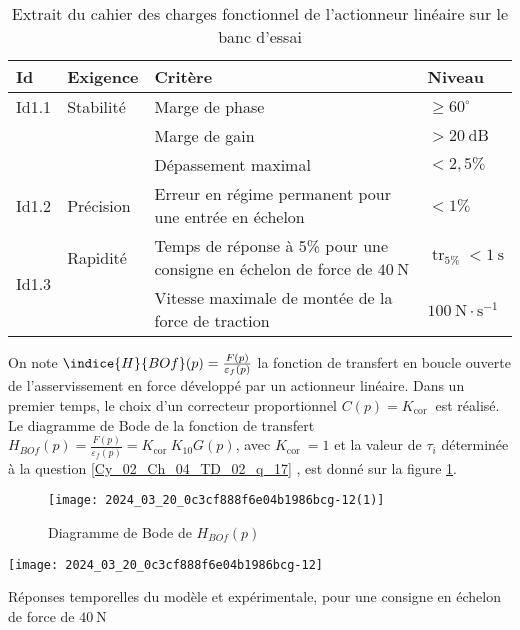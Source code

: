 \begin{table}[!h]
\begin{tabular}{llp{7cm}l}
\hline
\textbf{Id} & \textbf{Exigence} & \textbf{Critère} & \textbf{Niveau} \\
\hline
Id1.1 & Stabilité & Marge de phase & $\geqslant 60^{\circ}$ \\
 &  & Marge de gain & $>20 \mathrm{~dB}$ \\
 &  & Dépassement maximal & $<2,5 \%$ \\
Id1.2 & Précision & Erreur en régime permanent pour une entrée en échelon & $<1 \%$ \\
\multirow{2}{*}{Id1.3} & Rapidité & Temps de réponse à 5\% pour une consigne en échelon de force de $40 \mathrm{~N}$ & $\operatorname{tr}_{5 \%}<1 \mathrm{~s}$ \\
 &  & Vitesse maximale de montée de la force de traction & $100 \mathrm{~N} \cdot \mathrm{s}^{-1}$ \\
\hline
\end{tabular}
\caption{Extrait du cahier des charges fonctionnel de l'actionneur linéaire sur le banc d'essai \label{Cy_02_Ch_04_TD_02_tab_05}}
\end{table}

On note $\indice{H}{BO f}(p)=\frac{F(p)}{\varepsilon_{f}(p)}$ la fonction de transfert en boucle ouverte de l'asservissement en force développé par un actionneur linéaire. Dans un premier temps, le choix d'un correcteur proportionnel $C(p)=K_{\text {cor }}$ est réalisé. Le diagramme de Bode de la fonction de transfert $H_{B O f}(p)=\frac{F(p)}{\varepsilon_{f}(p)}=K_{\text {cor }} K_{10} G(p)$, avec $K_{\text {cor }}=1$ et la valeur de $\tau_{i}$ déterminée à la question \ref{Cy_02_Ch_04_TD_02_q_17} , est donné sur la figure \ref{Cy_02_Ch_04_TD_02_fig_16}.\\


\begin{figure}[!h]
\texttt{[image: 2024\_03\_20\_0c3cf888f6e04b1986bcg-12(1)]}
\caption{Diagramme de Bode de $H_{B O f}(p)$  \label{Cy_02_Ch_04_TD_02_fig_16}}
\end{figure}

\begin{marginfigure}%
\texttt{[image: 2024\_03\_20\_0c3cf888f6e04b1986bcg-12]}
\caption{Réponses temporelles du modèle et expérimentale, pour une consigne en échelon de force de $40 \mathrm{~N}$ \label{Cy_02_Ch_04_TD_02_fig_17}}
\end{marginfigure}
\ifprof
\begin{corrige}
\end{corrige}
\else
\fi




